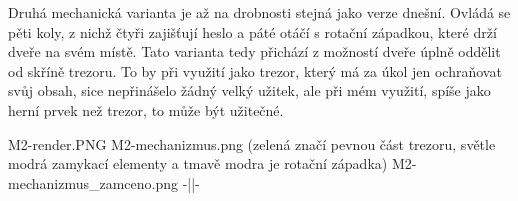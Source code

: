 Druhá mechanická varianta je až na drobnosti stejná jako verze dnešní.
Ovládá se pěti koly, z nichž čtyři zajišťují heslo a páté otáčí s rotační západkou, které drží dveře na svém místě.
Tato varianta tedy přichází z možností dveře úplně oddělit od skříně trezoru. To by při využití jako trezor, který
má za úkol jen ochraňovat svůj obsah, sice nepřinášelo žádný velký užitek, ale při mém využití, spíše jako herní 
prvek než trezor, to může být užitečné.

M2-render.PNG
M2-mechanizmus.png  	    (zelená značí pevnou část trezoru, světle modrá zamykací elementy a tmavě modra je rotační západka)
M2-mechanizmus_zamceno.png  -||-
